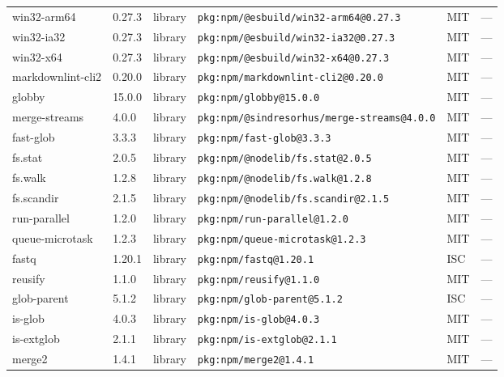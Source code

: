 \documentclass[11pt,a4paper]{article}
\begin{document}
\begin{longtable}{|p{4cm}|p{2cm}|p{1.6cm}|p{5cm}|p{1.5cm}|p{3.5cm}|}
\raggedright win32-arm64 & 0.27.3 & library & \small\texttt{pkg:npm/@esbuild/win32-arm64@0.27.3} & MIT & \small — \\
\raggedright win32-ia32 & 0.27.3 & library & \small\texttt{pkg:npm/@esbuild/win32-ia32@0.27.3} & MIT & \small — \\
\raggedright win32-x64 & 0.27.3 & library & \small\texttt{pkg:npm/@esbuild/win32-x64@0.27.3} & MIT & \small — \\
\raggedright markdownlint-cli2 & 0.20.0 & library & \small\texttt{pkg:npm/markdownlint-cli2@0.20.0} & MIT & \small — \\
\raggedright globby & 15.0.0 & library & \small\texttt{pkg:npm/globby@15.0.0} & MIT & \small — \\
\raggedright merge-streams & 4.0.0 & library & \small\texttt{pkg:npm/@sindresorhus/merge-streams@4.0.0} & MIT & \small — \\
\raggedright fast-glob & 3.3.3 & library & \small\texttt{pkg:npm/fast-glob@3.3.3} & MIT & \small — \\
\raggedright fs.stat & 2.0.5 & library & \small\texttt{pkg:npm/@nodelib/fs.stat@2.0.5} & MIT & \small — \\
\raggedright fs.walk & 1.2.8 & library & \small\texttt{pkg:npm/@nodelib/fs.walk@1.2.8} & MIT & \small — \\
\raggedright fs.scandir & 2.1.5 & library & \small\texttt{pkg:npm/@nodelib/fs.scandir@2.1.5} & MIT & \small — \\
\raggedright run-parallel & 1.2.0 & library & \small\texttt{pkg:npm/run-parallel@1.2.0} & MIT & \small — \\
\raggedright queue-microtask & 1.2.3 & library & \small\texttt{pkg:npm/queue-microtask@1.2.3} & MIT & \small — \\
\raggedright fastq & 1.20.1 & library & \small\texttt{pkg:npm/fastq@1.20.1} & ISC & \small — \\
\raggedright reusify & 1.1.0 & library & \small\texttt{pkg:npm/reusify@1.1.0} & MIT & \small — \\
\raggedright glob-parent & 5.1.2 & library & \small\texttt{pkg:npm/glob-parent@5.1.2} & ISC & \small — \\
\raggedright is-glob & 4.0.3 & library & \small\texttt{pkg:npm/is-glob@4.0.3} & MIT & \small — \\
\raggedright is-extglob & 2.1.1 & library & \small\texttt{pkg:npm/is-extglob@2.1.1} & MIT & \small — \\
\raggedright merge2 & 1.4.1 & library & \small\texttt{pkg:npm/merge2@1.4.1} & MIT & \small — \\

\end{longtable}
\end{document}
